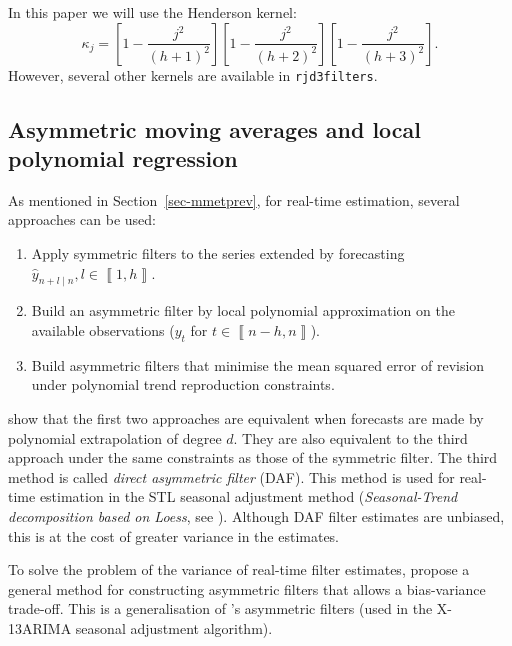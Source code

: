 \documentclass[
]{article}
\newcommand\1{\mathds{1}}
\begin{document}
In this paper we will use the Henderson kernel: \[
\kappa_{j}=\left[1-\frac{j^2}{(h+1)^2}\right]
\left[1-\frac{j^2}{(h+2)^2}\right]
\left[1-\frac{j^2}{(h+3)^2}\right].
\] However, several other kernels are available in \texttt{rjd3filters}.

\subsection{Asymmetric moving averages and local polynomial
regression}\label{sec-lppasymf}

As mentioned in Section~\ref{sec-mmetprev}, for real-time estimation,
several approaches can be used:

\begin{enumerate}
\def\labelenumi{\arabic{enumi}.}
\item
  Apply symmetric filters to the series extended by forecasting
  \(\hat{y}_{n+l\mid n},l\in\left\llbracket 1,h\right\rrbracket\).
\item
  Build an asymmetric filter by local polynomial approximation on the
  available observations (\(y_{t}\) for
  \(t\in\left\llbracket n-h,n\right\rrbracket\)).
\item
  Build asymmetric filters that minimise the mean squared error of
  revision under polynomial trend reproduction constraints.
\end{enumerate}

\textcite{proietti2008} show that the first two approaches are
equivalent when forecasts are made by polynomial extrapolation of degree
\(d\). They are also equivalent to the third approach under the same
constraints as those of the symmetric filter. The third method is called
\emph{direct asymmetric filter} (DAF). This method is used for real-time
estimation in the STL seasonal adjustment method (\emph{Seasonal-Trend
decomposition based on Loess}, see \textcite{cleveland90}). Although DAF
filter estimates are unbiased, this is at the cost of greater variance
in the estimates.

To solve the problem of the variance of real-time filter estimates,
\textcite{proietti2008} propose a general method for constructing
asymmetric filters that allows a bias-variance trade-off. This is a
generalisation of \textcite{musgrave1964set}'s asymmetric filters (used
in the X-13ARIMA seasonal adjustment algorithm).
\end{document}
